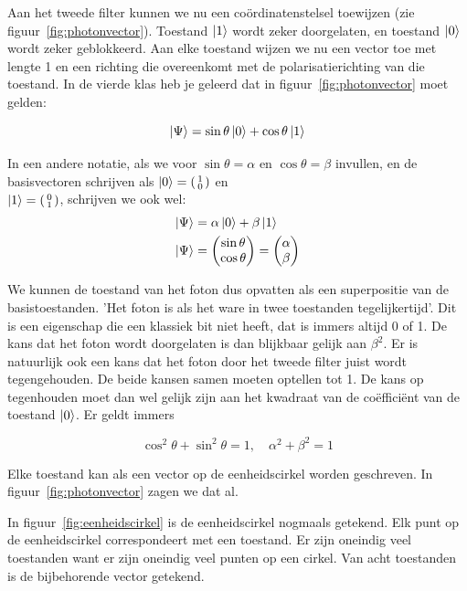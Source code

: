 \documentclass[../../main.tex]{subfiles}
\begin{document}
Aan het tweede filter kunnen we nu een co\"ordinatenstelsel toewijzen (zie figuur~\ref{fig:photonvector}). Toestand $\ket{1}$ wordt zeker doorgelaten, en toestand  $\ket{0}$ wordt zeker geblokkeerd. Aan elke toestand wijzen we nu een vector toe met lengte 1 en een richting die overeenkomt met de polarisatierichting van die toestand. In de vierde klas heb je geleerd dat in figuur~\ref{fig:photonvector} moet gelden:

\[\ket{\Psi}=\sin\theta\ket{0}+\cos\theta\ket{1}\]

In een andere notatie, als we voor $\sin\theta=\alpha$ en $\cos\theta=\beta$ invullen,  en de basisvectoren schrijven als $\ket{0} = \smqty(1\\0)$ en\\ $\ket{1} = \smqty(0\\1)$, schrijven we ook wel: 
\[\begin{aligned}
\ket{\Psi}&=\alpha\ket{0}+\beta\ket{1}\\
\ket{\Psi}&=\mqty(\sin\theta \\ \cos\theta)=\mqty(\alpha \\ \beta)
\end{aligned}\]

We kunnen de toestand van het foton dus opvatten als een superpositie van de basistoestanden. 'Het foton is als het ware in twee toestanden tegelijkertijd'. Dit is een eigenschap die een klassiek bit niet heeft, dat is immers altijd 0 of 1. De kans dat het foton wordt doorgelaten is dan blijkbaar gelijk aan  $\beta^2$. Er is natuurlijk ook een  kans dat het foton door het tweede filter juist wordt tegengehouden. De beide kansen samen moeten optellen tot 1. De kans op tegenhouden moet dan wel gelijk zijn aan het kwadraat van de co\"effici\"ent van de toestand $\ket{0}$.  Er geldt immers 

\[\cos^2\theta + \sin^2\theta=1 , \quad \alpha^2+\beta^2=1\]

Elke toestand kan als een vector op de eenheidscirkel worden geschreven. In figuur~\ref{fig:photonvector} zagen we dat al.

In figuur~\ref{fig:eenheidscirkel} is de eenheidscirkel nogmaals getekend. Elk punt op de eenheidscirkel correspondeert met een toestand. Er zijn oneindig veel toestanden want er zijn oneindig veel punten op een cirkel. Van acht toestanden is de bijbehorende vector getekend. 
\end{document}
